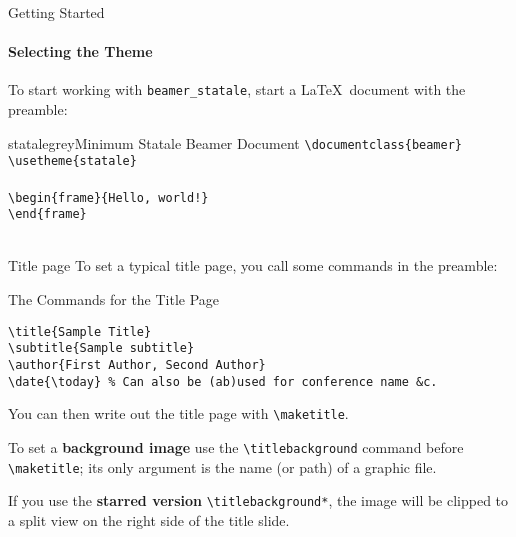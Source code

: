 \begin{frame}[fragile]{Getting Started}
\framesubtitle{Selecting the Theme}
To start working with \texttt{beamer\_statale}, start a \LaTeX\ document with the preamble:
\begin{colorblock}[black]{statalegrey}{Minimum Statale Beamer Document}
    \verb|\documentclass{beamer}|\\
    \verb|\usetheme{statale}|\\
    \verb||\\
    \verb|\begin{frame}{Hello, world!}|\\
    \verb|\end{frame}|\\
    \verb||\\
\end{colorblock}
\end{frame}


\begin{frame}[fragile]{Title page}
To set a typical title page, you call some commands in the preamble:
\begin{block}{The Commands for the Title Page}
\begin{verbatim}
\title{Sample Title}
\subtitle{Sample subtitle}
\author{First Author, Second Author}
\date{\today} % Can also be (ab)used for conference name &c.
\end{verbatim}
\end{block}
You can then write out the title page with \verb|\maketitle|.

To set a \textbf{background image} use the \verb|\titlebackground| command  before \verb|\maketitle|; its only argument is the name (or path) of a graphic file.

If you use the \textbf{starred version} \verb|\titlebackground*|, the image  will be clipped to a split view on the right side of the title slide.
\end{frame}


